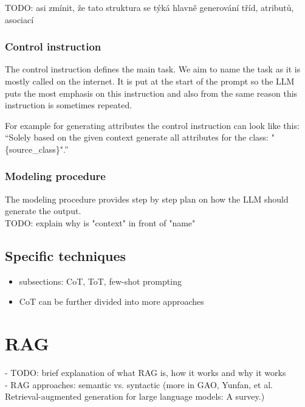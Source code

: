 TODO: asi zmínit, že tato struktura se týká hlavně generování tříd, atributů, asociací


\subsubsection{Control instruction}
The control instruction defines the main task. We aim to name the task as it is mostly called on the internet.
It is put at the start of the prompt so the LLM puts the most emphasis on this instruction and also from the same reason this instruction is sometimes repeated.

For example for generating attributes the control instruction can look like this:
``Solely based on the given context generate all attributes for the class: "\{source\_class\}".''

\subsubsection{Modeling procedure}

The modeling procedure provides step by step plan on how the LLM should generate the output. \\

TODO: explain why is "context" in front of "name"


\subsection{Specific techniques}
\begin{itemize}
\item subsections: CoT, ToT, few-shot prompting \\
\item CoT can be further divided into more approaches
\end{itemize}



\section{RAG}
- TODO: brief explanation of what RAG is, how it works and why it works \\
- RAG approaches: semantic vs. syntactic (more in GAO, Yunfan, et al. Retrieval-augmented generation for large language models: A survey.) \\